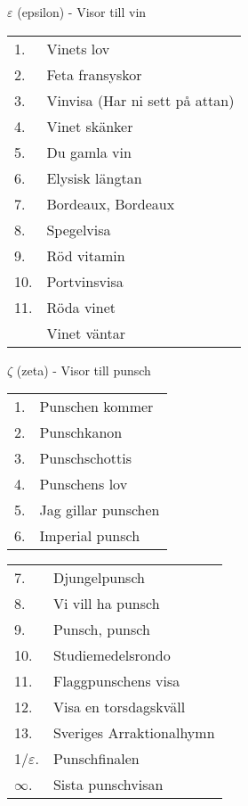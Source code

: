 \documentclass[a6paper,10pt]{article}
\begin{document}
\vspace{5pt}

\noindent \Large $\varepsilon$ (epsilon) - Visor till vin

\normalsize
\noindent
\begin{tabularx}{1\textwidth}{l X}
1.&Vinets lov\\
2.&Feta fransyskor\\
3.&Vinvisa (Har ni sett på attan)\\
4.&Vinet skänker\\
5.&Du gamla vin\\
6.&Elysisk längtan\\
7.&Bordeaux, Bordeaux\\
8.&Spegelvisa\\
9.&Röd vitamin\\
10.&Portvinsvisa\\
11.&Röda vinet\\
&Vinet väntar
\end{tabularx}

\vspace{5pt}

\noindent \Large $\zeta$ (zeta) - Visor till punsch

\normalsize
\noindent
\begin{tabularx}{1\textwidth}{l X}
1.&Punschen kommer\\
2.&Punschkanon\\
3.&Punschschottis\\
4.&Punschens lov\\
5.&Jag gillar punschen\\
6.&Imperial punsch\\
\end{tabularx}

\newpage

\noindent
\begin{tabularx}{1\textwidth}{l X}
7.&Djungelpunsch\\
8.&Vi vill ha punsch\\
9.&Punsch, punsch\\
10.&Studiemedelsrondo\\
11.&Flaggpunschens visa\\
12.&Visa en torsdagskväll\\
13.&Sveriges Arraktionalhymn\\
1/$\varepsilon$.&Punschfinalen\\
$\infty$.&Sista punschvisan
\end{tabularx}

\vspace{5pt}
\end{document}
